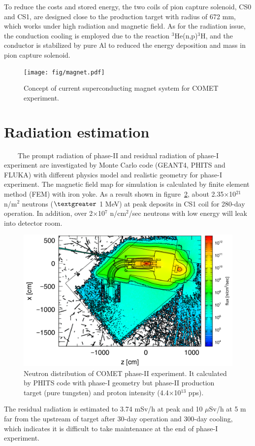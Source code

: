 \documentclass[a4paper, 10pt, twocolumn]{article}
\begin{document}
To reduce the costs and stored energy, the two coils of pion capture solenoid, CS0 and CS1, are designed close to the production target with radius of 672 mm, which works under high radiation and magnetic field.
As for the radiation issue, the conduction cooling is employed due to the reaction $^3$He(n,p)$^3$H, and the conductor is stabilized by pure Al to reduced the energy deposition and mass in pion capture solenoid.
\begin{figure}[H]
 \centering
 \texttt{[image: fig/magnet.pdf]}
 \caption{Concept of current superconducting magnet system for COMET experiment.}
 \label{magnet}
\end{figure}

\section{Radiation estimation}
~~~~The prompt radiation of phase-II and residual radiation of phase-I experiment are investigated by Monte Carlo code (GEANT4\cite{geant}, PHITS and FLUKA\cite{fluka}) with different physics model and realistic geometry for phase-I experiment.
The magnetic field map for simulation is calculated by finite element method (FEM) with iron yoke.
As a result shown in figure~\ref{geo}, about 2.35$\times$10$^{21}$ n/m$^2$ neutrons ($\textgreater$ 1 MeV) at peak deposits in CS1 coil for 280-day operation.
In addition, over 2$\times$10$^7$ n/cm$^2$/sec neutrons with low energy will leak into detector room.
\begin{figure}[H]
 \centering
 \includegraphics[scale=0.3]{fig/neutron.pdf}
 \caption{Neutron distribution of COMET phase-II experiment. It calculated by PHITS code with phase-I geometry but phase-II production target (pure tungsten) and proton intensity (4.4$\times$10$^{13}$ pps).}
 \label{geo}
\end{figure}
The residual radiation is estimated to 3.74 mSv/h at peak and 10 $\mu$Sv/h at 5 m far from the upstream of target after 30-day operation and 300-day cooling, which indicates it is difficult to take maintenance at the end of phase-I experiment.
\end{document}
